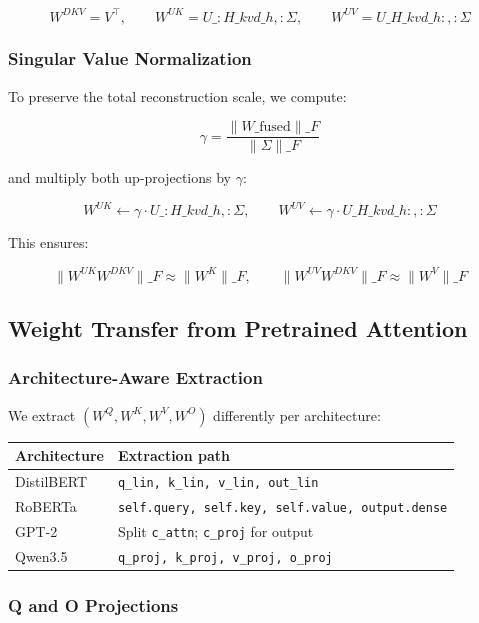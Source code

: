 \[
W^{DKV} = V^\top, \qquad
W^{UK} = U\_{:H\_{kv} d\_h, :} \Sigma, \qquad
W^{UV} = U\_{H\_{kv} d\_h:, :} \Sigma
\tag{4.4}
\]

\subsubsection{Singular Value Normalization}

To preserve the total reconstruction scale, we compute:

\[
\gamma = \frac{\|W\_\text{fused}\|\_F}{\|\Sigma\|\_F}
\tag{4.5}
\]

and multiply both up-projections by $\gamma$:

\[
W^{UK} \leftarrow \gamma \cdot U\_{:H\_{kv} d\_h, :} \Sigma, \qquad
W^{UV} \leftarrow \gamma \cdot U\_{H\_{kv} d\_h:, :} \Sigma
\tag{4.6}
\]

This ensures:

\[
\|W^{UK} W^{DKV}\|\_F \approx \|W^K\|\_F, \qquad
\|W^{UV} W^{DKV}\|\_F \approx \|W^V\|\_F
\tag{4.7}
\]

\subsection{Weight Transfer from Pretrained Attention}

\subsubsection{Architecture-Aware Extraction}

We extract $(W^Q, W^K, W^V, W^O)$ differently per architecture:

\begin{table}[H]
\centering
\small
\begin{tabular}{ll}
\toprule
\textbf{Architecture} & \textbf{Extraction path} \\
\midrule
DistilBERT & \texttt{q\_lin, k\_lin, v\_lin, out\_lin} \\
RoBERTa & \texttt{self.query, self.key, self.value, output.dense} \\
GPT-2 & Split \texttt{c\_attn}; \texttt{c\_proj} for output \\
Qwen3.5 & \texttt{q\_proj, k\_proj, v\_proj, o\_proj} \\
\bottomrule
\end{tabular}
\end{table}

\subsubsection{Q and O Projections}

